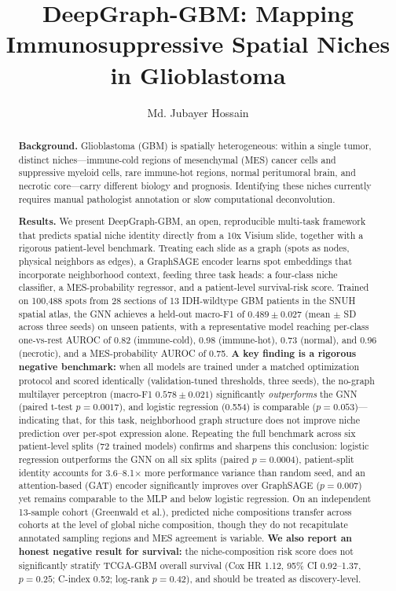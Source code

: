 \documentclass[11pt,letterpaper]{article}
\title{\vspace{-1.5em}\bfseries DeepGraph-GBM: Mapping Immunosuppressive Spatial Niches in Glioblastoma}
\author[1,2,*]{Md. Jubayer Hossain}
\affil[1]{Center for Health Innovation, Research, Action, and Learning - Bangladesh}
\affil[2]{DeepBio}
\affil[*]{Corresponding author: \texttt{hossainmj.me@gmail.com}}
\date{}
\begin{document}
\maketitle
\thispagestyle{fancy}

\begin{abstract}
\small
\noindent\textbf{Background.} Glioblastoma (GBM) is spatially heterogeneous: within a single tumor, distinct niches---immune-cold regions of mesenchymal (MES) cancer cells and suppressive myeloid cells, rare immune-hot regions, normal peritumoral brain, and necrotic core---carry different biology and prognosis. Identifying these niches currently requires manual pathologist annotation or slow computational deconvolution.

\noindent\textbf{Results.} We present DeepGraph-GBM, an open, reproducible multi-task framework that predicts spatial niche identity directly from a 10x Visium slide, together with a rigorous patient-level benchmark. Treating each slide as a graph (spots as nodes, physical neighbors as edges), a GraphSAGE encoder learns spot embeddings that incorporate neighborhood context, feeding three task heads: a four-class niche classifier, a MES-probability regressor, and a patient-level survival-risk score. Trained on 100{,}488 spots from 28 sections of 13 IDH-wildtype GBM patients in the SNUH spatial atlas, the GNN achieves a held-out macro-F1 of $0.489 \pm 0.027$ (mean $\pm$ SD across three seeds) on unseen patients, with a representative model reaching per-class one-vs-rest AUROC of 0.82 (immune-cold), 0.98 (immune-hot), 0.73 (normal), and 0.96 (necrotic), and a MES-probability AUROC of 0.75. \textbf{A key finding is a rigorous negative benchmark:} when all models are trained under a matched optimization protocol and scored identically (validation-tuned thresholds, three seeds), the no-graph multilayer perceptron (macro-F1 $0.578 \pm 0.021$) significantly \emph{outperforms} the GNN (paired t-test $p=0.0017$), and logistic regression (0.554) is comparable ($p=0.053$)---indicating that, for this task, neighborhood graph structure does not improve niche prediction over per-spot expression alone. Repeating the full benchmark across six patient-level splits (72 trained models) confirms and sharpens this conclusion: logistic regression outperforms the GNN on all six splits (paired $p=0.0004$), patient-split identity accounts for 3.6--8.1$\times$ more performance variance than random seed, and an attention-based (GAT) encoder significantly improves over GraphSAGE ($p=0.007$) yet remains comparable to the MLP and below logistic regression. On an independent 13-sample cohort (Greenwald et al.), predicted niche compositions transfer across cohorts at the level of global niche composition, though they do not recapitulate annotated sampling regions and MES agreement is variable. \textbf{We also report an honest negative result for survival:} the niche-composition risk score does not significantly stratify TCGA-GBM overall survival (Cox HR 1.12, 95\% CI 0.92--1.37, $p=0.25$; C-index 0.52; log-rank $p=0.42$), and should be treated as discovery-level.


\end{abstract}
\end{document}
